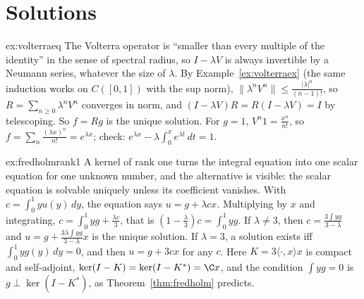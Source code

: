 \section{Solutions}

\begin{solution}{ex:volterraeq}
\idea The Volterra operator is ``smaller than every multiple of the identity'' in the sense of spectral radius, so $I-\lambda V$ is always invertible by a Neumann series, whatever the size of $\lambda$.
\writeup By Example~\ref{ex:volterraex} (the same induction works on $C([0,1])$ with the sup norm), $\|\lambda^nV^n\|\le\frac{|\lambda|^n}{(n-1)!}$, so $R=\sum_{n\ge0}\lambda^nV^n$ converges in norm, and $(I-\lambda V)R=R(I-\lambda V)=I$ by
telescoping. So $f=Rg$ is the unique solution. For $g=1$, $V^n1=\frac{x^n}{n!}$, so $f=\sum_n\frac{(\lambda x)^n}{n!}=e^{\lambda x}$; check: $e^{\lambda x}-\lambda\int_0^xe^{\lambda t}\,dt=1$.
\end{solution}

\begin{solution}{ex:fredholmrank1}
\idea A kernel of rank one turns the integral equation into one scalar equation for one unknown number, and the alternative is visible: the scalar equation is solvable uniquely unless its coefficient vanishes.
\writeup With $c=\int_0^1yu(y)\,dy$, the equation says $u=g+\lambda cx$. Multiplying by $x$ and integrating, $c=\int_0^1yg+\frac{\lambda c}3$, that is $(1-\frac\lambda3)c=\int_0^1yg$. If $\lambda\ne3$, then $c=\frac{3\int yg}{3-\lambda}$ and
$u=g+\frac{3\lambda\int yg}{3-\lambda}x$ is the unique solution. If $\lambda=3$, a solution exists iff $\int_0^1yg(y)\,dy=0$, and then $u=g+3cx$ for any $c$. Here $K=3\langle\cdot,x\rangle x$ is compact and self-adjoint, $\ker(I-K)=\ker(I-K^*)=\C x$, and the
condition $\int yg=0$ is $g\perp\ker(I-K^*)$, as Theorem~\ref{thm:fredholm} predicts.
\end{solution}

